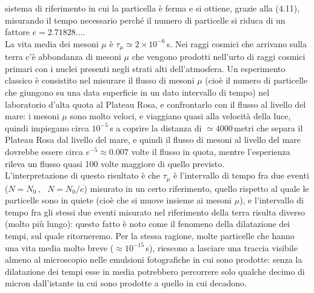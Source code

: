 sistema di riferimento in cui la particella \`e ferma e si ottiene, grazie alla
(4.11), misurando il tempo necessario perch\'e il numero di particelle si riduca
di un fattore $e=2.71828\dots$.\\
La vita media dei mesoni $\mu$ \`e $\tau_\mu\simeq2\times10^{-6}$\,s. Nei raggi
cosmici che arrivano sulla terra c'\`e abbondanza di mesoni $\mu$ che vengono
prodotti nell'urto di raggi cosmici primari con i nuclei presenti negli strati
alti dell'atmosfera. Un esperimento classico \`e consistito nel misurare il
flusso di mesoni $\mu$ (cio\`e il numero di particelle che giungono su una data
superficie in un dato intervallo di tempo) nel laboratorio d'alta quota al
Plateau Rosa, e confrontarlo con il flusso al livello del mare: i mesoni $\mu$
sono molto veloci, e viaggiano quasi alla velocit\`a della luce, quindi
impiegano circa $10^{-5}$\,s a coprire la distanza di $\simeq4000$\,metri che
separa il Plateau Rosa dal livello del mare, e quindi il flusso di mesoni al
livello del mare dovrebbe essere circa $e^{-5}\approx0.007$ volte il flusso in
quota, mentre l'esperienza rileva un flusso quasi 100 volte maggiore di quello
previsto.\\
L'interpretazione di questo risultato \`e che $\tau_\mu$ \`e l'intervallo di
tempo fra due eventi ($N=N_0$\,, \ $N=N_0/e$) misurato in un certo riferimento,
quello rispetto al quale le particelle sono in quiete (cio\`e che si muove
insieme ai mesoni $\mu$), e l'intervallo di tempo fra gli stessi due eventi
misurato nel riferimento della terra risulta diverso (molto pi\`u lungo): questo
fatto \`e noto come il fenomeno della dilatazione dei tempi, sul quale
ritorneremo. Per la stessa ragione, molte particelle che hanno una vita media
molto breve ($\approx10^{-15}$\,s), riescono a lasciare una traccia visibile
almeno al microscopio nelle emulsioni fotografiche in cui sono prodotte: senza
la dilatazione dei tempi esse in media potrebbero percorrere solo qualche decimo
di micron dall'istante in cui sono prodotte a quello in cui decadono.

